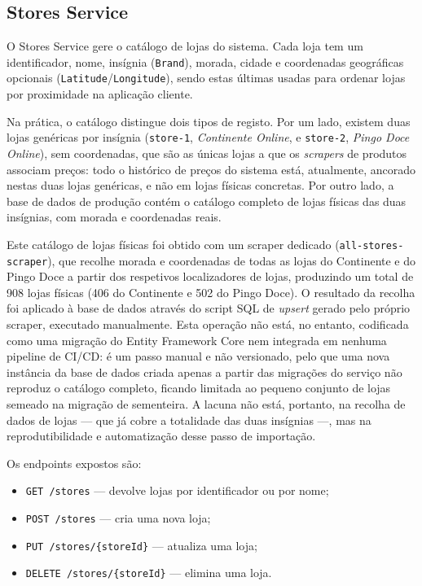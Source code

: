 \subsection{Stores Service}
\label{sec:4.2.4}

O Stores Service gere o catálogo de lojas do sistema. Cada loja tem um identificador, nome, insígnia (\texttt{Brand}), morada, cidade e coordenadas geográficas opcionais (\texttt{Latitude}/\texttt{Longitude}), sendo estas últimas usadas para ordenar lojas por proximidade na aplicação cliente.

Na prática, o catálogo distingue dois tipos de registo. Por um lado, existem duas lojas genéricas por insígnia (\texttt{store-1}, \textit{Continente Online}, e \texttt{store-2}, \textit{Pingo Doce Online}), sem coordenadas, que são as únicas lojas a que os \textit{scrapers} de produtos associam preços: todo o histórico de preços do sistema está, atualmente, ancorado nestas duas lojas genéricas, e não em lojas físicas concretas. Por outro lado, a base de dados de produção contém o catálogo completo de lojas físicas das duas insígnias, com morada e coordenadas reais.

Este catálogo de lojas físicas foi obtido com um scraper dedicado (\texttt{all-stores-scraper}), que recolhe morada e coordenadas de todas as lojas do Continente e do Pingo Doce a partir dos respetivos localizadores de lojas, produzindo um total de 908 lojas físicas (406 do Continente e 502 do Pingo Doce). O resultado da recolha foi aplicado à base de dados através do script \ac{SQL} de \textit{upsert} gerado pelo próprio scraper, executado manualmente. Esta operação não está, no entanto, codificada como uma migração do Entity Framework Core nem integrada em nenhuma pipeline de \ac{CI/CD}: é um passo manual e não versionado, pelo que uma nova instância da base de dados criada apenas a partir das migrações do serviço não reproduz o catálogo completo, ficando limitada ao pequeno conjunto de lojas semeado na migração de sementeira. A lacuna não está, portanto, na recolha de dados de lojas — que já cobre a totalidade das duas insígnias —, mas na reprodutibilidade e automatização desse passo de importação.

Os endpoints expostos são:

\begin{itemize}
    \item \texttt{GET /stores} — devolve lojas por identificador ou por nome;
    \item \texttt{POST /stores} — cria uma nova loja;
    \item \texttt{PUT /stores/\{storeId\}} — atualiza uma loja;
    \item \texttt{DELETE /stores/\{storeId\}} — elimina uma loja.
\end{itemize}

